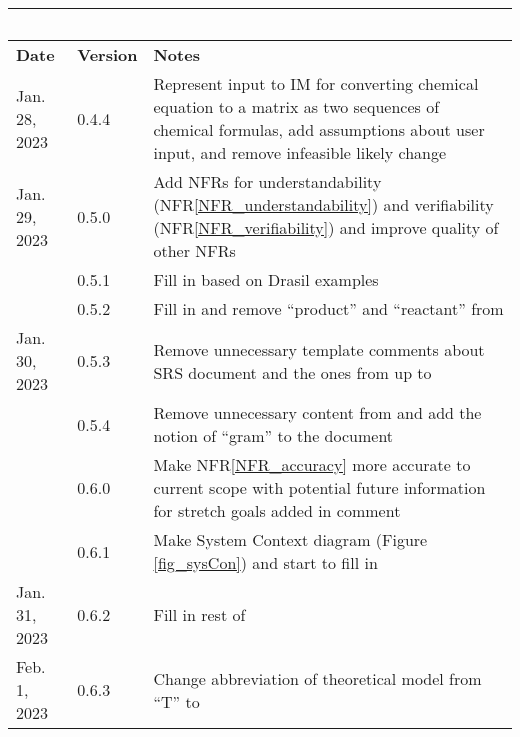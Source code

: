 \documentclass[12pt]{article}
\newcommand{\nfrref}[1]{NFR\ref{#1}}
\begin{document}
\begin{tabularx}{\textwidth}{p{2.5cm}p{1.5cm}X}
  ~                                                                                                          \\
  \toprule {\bf Date} & {\bf Version} & {\bf Notes}                                                          \\
  \midrule
  Jan. 28, 2023       & 0.4.4         & Represent input to IM for converting
  chemical equation to a matrix as two sequences of chemical
  formulas, add assumptions about user input, and remove infeasible
  likely change                                                                                              \\
  Jan. 29, 2023       & 0.5.0         & Add NFRs for understandability
  (\nfrref{NFR_understandability}) and verifiability
  (\nfrref{NFR_verifiability}) and improve quality of other NFRs                                             \\
                      & 0.5.1         & Fill in \nameref{sec_intro} based on Drasil examples                 \\
                      & 0.5.2         & Fill in \nameref{sec_phySystDesc} and remove ``product'' and
  ``reactant'' from \nameref{sec_termsDefs}                                                                  \\
  Jan. 30, 2023       & 0.5.3         & Remove unnecessary template comments about SRS document
  and the ones from \nameref{sec_specSysDesc} up to \nameref{sec_instance}                                   \\
                      & 0.5.4         & Remove unnecessary content from \nameref{sec_tabSymbs} and
  add the notion of ``gram'' to the document                                                                 \\
                      & 0.6.0         & Make \nfrref{NFR_accuracy} more accurate to current scope with
  potential future information for stretch goals added in comment                                            \\
                      & 0.6.1         & Make System Context diagram (Figure \ref{fig_sysCon}) and start
  to fill in \nameref{sec_sysCon}                                                                            \\
  Jan. 31, 2023       & 0.6.2         & Fill in rest of \nameref{sec_genSysDesc}                             \\
  Feb. 1, 2023        & 0.6.3         & Change abbreviation of theoretical model from ``T'' to

\end{tabularx}
\end{document}
